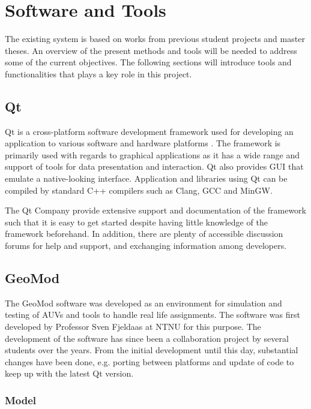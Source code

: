 \chapter{Software and Tools}
\label{existing_tech}

The existing system is based on works from previous student projects and master theses. An overview of the present methods and tools will be needed to address some of the current objectives. The following sections will introduce tools and functionalities that plays a key role in this project.

\section{Qt}

Qt is a cross-platform software development framework used for developing an application to various software and hardware platforms \cite{qt}. The framework is primarily used with regards to graphical applications as it has a wide range and support of tools for data presentation and interaction. Qt also provides GUI that emulate a native-looking interface. Application and libraries using Qt can be compiled by standard C++ compilers such as Clang, GCC and MinGW. 

The Qt Company provide extensive support and documentation of the framework such that it is easy to get started despite having little knowledge of the framework beforehand. In addition, there are plenty of accessible discussion forums for help and support, and exchanging information among developers.


\section{GeoMod}

The GeoMod software was developed as an environment for simulation and testing of AUVs and tools to handle real life assignments. The software was first developed by Professor Sven Fjeldaas at NTNU for this purpose. The development of the software has since been a collaboration project by several students over the years. From the initial development until this day, substantial changes have been done, e.g. porting between platforms and update of code to keep up with the latest Qt version.


\subsection{Model}
\label{chap:model}


